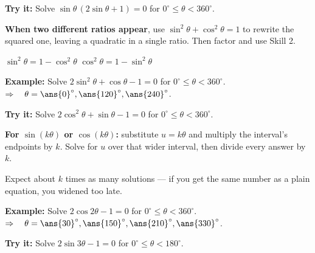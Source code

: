 \documentclass[12pt]{article}
\begin{document}
\begin{tryitbox}
\textbf{Try it:} \quad Solve $\sin\theta\,(2\sin\theta + 1) = 0$ for $0^\circ \le \theta < 360^\circ$.\\[2pt]
\end{tryitbox}


\begin{formulabox}
\textbf{When two different ratios appear}, use $\sin^2\theta + \cos^2\theta = 1$ to rewrite the squared one, leaving a quadratic in a single ratio. Then factor and use Skill 2.\par
$\sin^2\theta = 1 - \cos^2\theta$ \qquad $\cos^2\theta = 1 - \sin^2\theta$
\end{formulabox}

\begin{examplebox}
\textbf{Example:} \quad Solve $2\sin^2\theta + \cos\theta - 1 = 0$ for $0^\circ \le \theta < 360^\circ$.
$\Rightarrow\quad \theta = \ans{0}^\circ, \ans{120}^\circ, \ans{240}^\circ$.
\end{examplebox}

\begin{tryitbox}
\textbf{Try it:} \quad Solve $2\cos^2\theta + \sin\theta - 1 = 0$ for $0^\circ \le \theta < 360^\circ$.\\[2pt]
\end{tryitbox}


\begin{formulabox}
\textbf{For $\sin(k\theta)$ or $\cos(k\theta)$:} substitute $u = k\theta$ and multiply the interval's endpoints by $k$. Solve for $u$ over that wider interval, then divide every answer by $k$.\par
Expect about $k$ times as many solutions --- if you get the same number as a plain equation, you widened too late.
\end{formulabox}

\begin{examplebox}
\textbf{Example:} \quad Solve $2\cos 2\theta - 1 = 0$ for $0^\circ \le \theta < 360^\circ$.
\step{$u = 2\theta$ on $[0^\circ, 720^\circ)$, $\cos u = \dfrac{1}{2} \Rightarrow u = 60^\circ, 300^\circ, 420^\circ, 660^\circ$; halve each.}
$\Rightarrow\quad \theta = \ans{30}^\circ, \ans{150}^\circ, \ans{210}^\circ, \ans{330}^\circ$.
\end{examplebox}

\begin{tryitbox}
\textbf{Try it:} \quad Solve $2\sin 3\theta - 1 = 0$ for $0^\circ \le \theta < 180^\circ$.\\[2pt]
\end{tryitbox}
\end{document}
